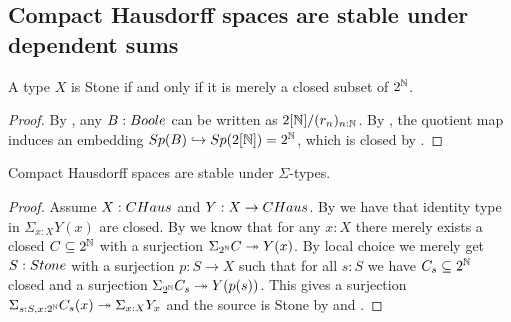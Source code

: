 \subsection{Compact Hausdorff spaces are stable under dependent sums}

\begin{lemma}\label{StoneAsClosedSubsetOfCantor}
A type $X$ is Stone if and only if it is merely a closed subset of $2^{\mathbb{N}}$.
\end{lemma}
\begin{proof}
  By , any $B:\Boole$ can be written as $2[\mathbb{N}]/(r_n)_{n:\mathbb{N}}$. %
  By , the quotient map induces an embedding $Sp(B)\hookrightarrow Sp(2[\mathbb{N}])= 2^{\mathbb{N}}$, 
  which is closed by .
\end{proof}


\begin{lemma}\label{SigmaCompactHausdorff}
Compact Hausdorff spaces are stable under $\Sigma$-types.
\end{lemma}

\begin{proof}
Assume $X:\CHaus$ and $Y:X\to \CHaus$. By  we have that identity type in $\Sigma_{x:X}Y(x)$ are closed. By  we know that for any $x:X$ there merely exists a closed $C\subseteq 2^{\mathbb{N}}$ with a surjection $\Sigma_{2^{\mathbb{N}}}C \twoheadrightarrow Y(x)$. By local choice we merely get $S:\Stone$ with a surjection $p:S\to X$ such that for all $s:S$ we have $C_s\subseteq 2^{\mathbb{N}}$ closed and a surjection $\Sigma_{2^{\mathbb{N}}}C_s\twoheadrightarrow Y(p(s))$. This gives a surjection $\Sigma_{s:S,x:2^{\mathbb{N}}}C_s(x)\twoheadrightarrow\Sigma_{x:X}Y_x$ and the source is Stone by  and .
\end{proof}
